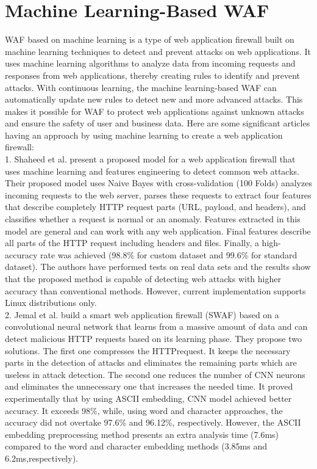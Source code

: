 \section{Machine Learning-Based WAF}
\label{sec:machine_learning_based}
WAF based on machine learning is a type of web application firewall built on machine learning techniques to detect and prevent attacks on web applications. It uses machine learning algorithms to analyze data from incoming requests and responses from web applications, thereby creating rules to identify and prevent attacks.
With continuous learning, the machine learning-based WAF can automatically update new rules to detect new and more advanced attacks. This makes it possible for WAF to protect web applications against unknown attacks and ensure the safety of user and business data. Here are some significant articles having an approach by using machine learning to create a web application firewall: \\
1.	Shaheed et al. \cite{Shaheed} present a proposed model for a web application firewall that uses machine learning and features engineering to detect common web attacks. Their proposed model uses Naive Bayes with cross-validation (100 Folds) analyzes incoming requests to the web server, parses these requests to extract four features that describe completely HTTP request parts (URL, payload, and headers), and classifies whether a request is normal or an anomaly. Features extracted in this model are general and can work with any web application. Final features describe all parts of the HTTP request including headers and files. Finally, a high-accuracy rate was achieved (98.8\% for custom dataset and 99.6\% for standard dataset). The authors have performed tests on real data sets and the results show that the proposed method is capable of detecting web attacks with higher accuracy than conventional methods. However, current implementation supports Linux distributions only. \\
2.	Jemal et al. \cite{Jemal} build a smart web application ﬁrewall (SWAF) based on a convolutional neural network that learns from a massive amount of data and can detect malicious HTTP requests based on its learning phase. They propose two solutions. The ﬁrst one compresses the HTTPrequest. It keeps the necessary parts in the detection of attacks and eliminates the remaining parts which are useless in attack detection. The second one reduces the number of CNN neurons and eliminates the unnecessary one that increases the needed time. It proved experimentally that by using ASCII embedding, CNN model achieved better accuracy. It exceeds 98\%, while, using word and character approaches, the accuracy did not overtake 97.6\% and 96.12\%, respectively. However, the ASCII embedding preprocessing method presents an extra analysis time (7.6ms) compared to the word and character embedding methods (3.85ms and 6.2ms,respectively).
